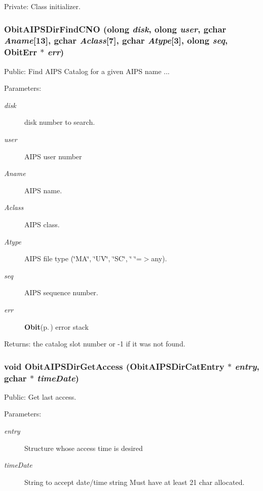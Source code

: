 Private: Class initializer. 

\subsubsection{ Obit\-AIPSDir\-Find\-CNO ({\bf olong} {\em disk}, {\bf olong} {\em user}, gchar {\em Aname}[13], gchar {\em Aclass}[7], gchar {\em Atype}[3], {\bf olong} {\em seq}, {\bf Obit\-Err} $\ast$ {\em err})}\label{ObitAIPSDir_8c_a19}


Public: Find AIPS Catalog for a given AIPS name ... 

\begin{Desc}
\item[Parameters:]
\begin{description}
\item[{\em disk}]disk number to search. \item[{\em user}]AIPS user number \item[{\em Aname}]AIPS name. \item[{\em Aclass}]AIPS class. \item[{\em Atype}]AIPS file type (\char`\"{}MA\char`\"{}, \char`\"{}UV\char`\"{}, \char`\"{}SC\char`\"{}, \char`\"{}  \char`\"{}=$>$any). \item[{\em seq}]AIPS sequence number. \item[{\em err}]{\bf Obit}{\rm (p.\,\pageref{structObit})} error stack \end{description}
\end{Desc}
\begin{Desc}
\item[Returns:]the catalog slot number or -1 if it was not found. \end{Desc}
\subsubsection{\setlength{\rightskip}{0pt plus 5cm}void Obit\-AIPSDir\-Get\-Access ({\bf Obit\-AIPSDir\-Cat\-Entry} $\ast$ {\em entry}, gchar $\ast$ {\em time\-Date})}\label{ObitAIPSDir_8c_a26}


Public: Get last access. 

\begin{Desc}
\item[Parameters:]
\begin{description}
\item[{\em entry}]Structure whose access time is desired \item[{\em time\-Date}]String to accept date/time string Must have at least 21 char allocated. \end{description}
\end{Desc}
